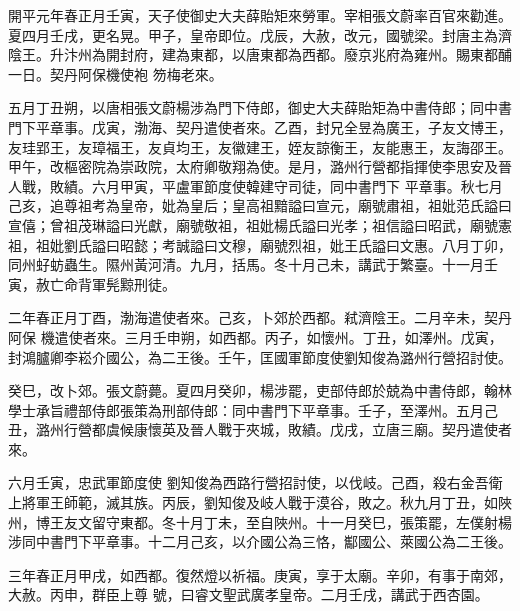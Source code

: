 
\begin{pinyinscope}

 開平元年春正月壬寅，天子使御史大夫薛貽矩來勞軍。宰相張文蔚率百官來勸進。夏四月壬戌，更名晃。甲子，皇帝即位。戊辰，大赦，改元，國號梁。封唐主為濟陰王。升汴州為開封府，建為東都，以唐東都為西都。廢京兆府為雍州。賜東都酺一日。契丹阿保機使袍
 笏梅老來。



 五月丁丑朔，以唐相張文蔚楊涉為門下侍郎，御史大夫薛貽矩為中書侍郎；同中書門下平章事。戊寅，渤海、契丹遣使者來。乙酉，封兄全昱為廣王，子友文博王，友珪郢王，友璋福王，友貞均王，友徽建王，姪友諒衡王，友能惠王，友誨邵王。甲午，改樞密院為崇政院，太府卿敬翔為使。是月，潞州行營都指揮使李思安及晉人戰，敗績。六月甲寅，平盧軍節度使韓建守司徒，同中書門下
 平章事。秋七月己亥，追尊祖考為皇帝，妣為皇后；皇高祖黯謚曰宣元，廟號肅祖，祖妣范氏謚曰宣僖；曾祖茂琳謚曰光獻，廟號敬祖，祖妣楊氏謚曰光孝；祖信謚曰昭武，廟號憲祖，祖妣劉氏謚曰昭懿；考誠謚曰文穆，廟號烈祖，妣王氏謚曰文惠。八月丁卯，同州虸蚄蟲生。隰州黃河清。九月，括馬。冬十月己未，講武于繁臺。十一月壬寅，赦亡命背軍髡黥刑徒。



 二年春正月丁酉，渤海遣使者來。己亥，卜郊於西都。弒濟陰王。二月辛未，契丹阿保
 機遣使者來。三月壬申朔，如西都。丙子，如懷州。丁丑，如澤州。戊寅，封鴻臚卿李崧介國公，為二王後。壬午，匡國軍節度使劉知俊為潞州行營招討使。



 癸巳，改卜郊。張文蔚薨。夏四月癸卯，楊涉罷，吏部侍郎於兢為中書侍郎，翰林學士承旨禮部侍郎張策為刑部侍郎：同中書門下平章事。壬子，至澤州。五月己丑，潞州行營都虞候康懷英及晉人戰于夾城，敗績。戊戌，立唐三廟。契丹遣使者來。



 六月壬寅，忠武軍節度使
 劉知俊為西路行營招討使，以伐岐。己酉，殺右金吾衛上將軍王師範，滅其族。丙辰，劉知俊及岐人戰于漠谷，敗之。秋九月丁丑，如陜州，博王友文留守東都。冬十月丁未，至自陜州。十一月癸巳，張策罷，左僕射楊涉同中書門下平章事。十二月己亥，以介國公為三恪，酅國公、萊國公為二王後。



 三年春正月甲戌，如西都。復然燈以祈福。庚寅，享于太廟。辛卯，有事于南郊，大赦。丙申，群臣上尊
 號，曰睿文聖武廣孝皇帝。二月壬戌，講武于西杏園。




\end{pinyinscope}
